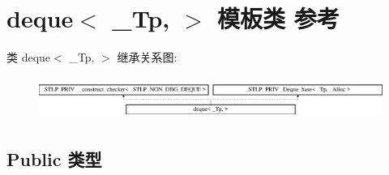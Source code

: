 \hypertarget{classdeque}{}\section{deque$<$ \+\_\+\+Tp, $>$ 模板类 参考}
\label{classdeque}
类 deque$<$ \+\_\+\+Tp, $>$ 继承关系图\+:\begin{figure}[H]
\begin{center}
\leavevmode
\includegraphics[height=1.417722cm]{classdeque}
\end{center}
\end{figure}
\subsection*{Public 类型}
